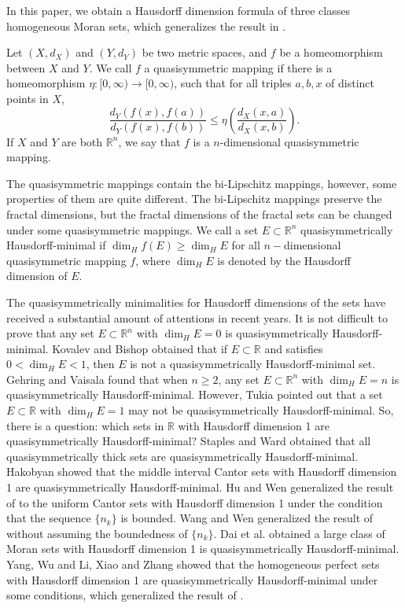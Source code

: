 \documentclass[reqno]{amsart}
\theoremstyle{plain}
\theoremstyle{definition}
\theoremstyle{remark}
\numberwithin{equation}{section} \DeclareMathOperator\intr{int}
\begin{document}
In this paper, we obtain a Hausdorff dimension formula  of three classes homogeneous Moran sets, which generalizes the result in \cite{wzywuj05}.

 Let $(X,d_X)$ and $(Y,d_Y)$ be two metric spaces, and $f$ be a homeomorphism between $X$ and $Y$. We call $f$ a quasisymmetric mapping  if there is a homeomorphism $\eta:[0,\infty)\to [0,\infty)$, such that for all triples $a, b, x$ of  distinct points in $X$,
\begin{equation*}
  \frac{d_Y(f(x),f(a))}{d_Y(f(x),f(b))}\le\eta(\frac{d_X(x,a)}{d_X(x,b)}).
\end{equation*}
If $X$ and $Y$ are both $\mathbb{R}^{n}$, we say that $f$ is a $n$-dimensional quasisymmetric mapping.

 The quasisymmetric mappings contain the bi-Lipschitz mappings, however, some properties of them are quite different. The bi-Lipschitz mappings preserve the fractal dimensions, but the fractal dimensions of the fractal sets can be changed under some quasisymmetric mappings. We call a set $E\subset\mathbb{R}^{n}$ quasisymmetrically Hausdorff-minimal if $\dim_{H}f(E)\ge \dim_{H}E$ for all $n-$dimensional quasisymmetric mapping $f$, where $\dim_{H}E$ is denoted by the Hausdorff dimension of $E$.

The quasisymmetrically minimalities for Hausdorff dimensions of the sets have received a substantial amount of attentions in recent years.
 It is not difficult to prove that any set $E\subset \mathbb{R}^n$ with $\dim_{H}E=0$ is quasisymmetrically Hausdorff-minimal\cite{Ahl06}.
Kovalev\cite{klv06} and Bishop\cite{bcj99} obtained that if $E\subset \mathbb{R}$ and satisfies $0<\dim_{H}E<1$, then $E$ is not a quasisymmetrically Hausdorff-minimal set. Gehring and Vaisala\cite{gfw,gfw2} found that when $n\ge2$, any set $E\subset \mathbb{R}^n$ with $\dim_{H}E=n$ is quasisymmetrically Hausdorff-minimal. However, Tukia\cite{tp89} pointed out that a set $E\subset \mathbb{R}$ with $\dim_{H}E=1$ may not be quasisymmetrically Hausdorff-minimal.
So, there is a question: which sets in $\mathbb{R}$ with Hausdorff dimension 1 are quasisymmetrically Hausdorff-minimal?
Staples and Ward\cite{ssg98} obtained that all quasisymmetrically thick sets are  quasisymmetrically Hausdorff-minimal.
Hakobyan\cite{hh06} showed that the middle interval Cantor sets with Hausdorff dimension 1 are quasisymmetrically Hausdorff-minimal.
Hu and Wen\cite{hmd08} generalized the result of \cite{hh06} to the uniform Cantor sets with Hausdorff dimension 1 under the condition that the sequence $\{n_k\}$ is bounded.
Wang and Wen\cite{ww14} generalized the result of \cite{hmd08} without assuming the boundedness of $\{n_k\}$.
Dai et al.\cite{dyx11} obtained a large class of Moran sets with Hausdorff dimension 1 is quasisymmetrically Hausdorff-minimal.
Yang, Wu and Li\cite{yjj18},  Xiao and Zhang{\cite{XYQ}} showed that the homogeneous perfect sets with Hausdorff dimension 1 are quasisymmetrically Hausdorff-minimal under some conditions, which generalized the result of \cite{ww14}.
\end{document}
